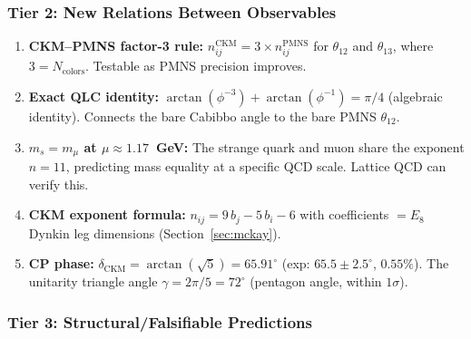 \documentclass[12pt,a4paper]{article}
\begin{document}
\subsubsection{Tier 2: New Relations Between Observables}

\begin{enumerate}
    \item \textbf{CKM--PMNS factor-3 rule:} $n^{\text{CKM}}_{ij} = 3 \times n^{\text{PMNS}}_{ij}$ for $\theta_{12}$ and $\theta_{13}$, where $3 = N_{\text{colors}}$. Testable as PMNS precision improves.

    \item \textbf{Exact QLC identity:} $\arctan(\phi^{-3}) + \arctan(\phi^{-1}) = \pi/4$ (algebraic identity). Connects the bare Cabibbo angle to the bare PMNS $\theta_{12}$.

    \item \textbf{$m_s = m_\mu$ at $\mu \approx 1.17$~GeV:} The strange quark and muon share the exponent $n=11$, predicting mass equality at a specific QCD scale. Lattice QCD can verify this.

    \item \textbf{CKM exponent formula:} $n_{ij} = 9\,b_j - 5\,b_i - 6$ with coefficients $= E_8$ Dynkin leg dimensions (Section~\ref{sec:mckay}).

    \item \textbf{CP phase:} $\delta_{\text{CKM}} = \arctan(\sqrt{5}) = 65.91^\circ$ (exp: $65.5 \pm 2.5^\circ$, $0.55\%$). The unitarity triangle angle $\gamma = 2\pi/5 = 72^\circ$ (pentagon angle, within $1\sigma$).
\end{enumerate}

\subsubsection{Tier 3: Structural/Falsifiable Predictions}
\end{document}
